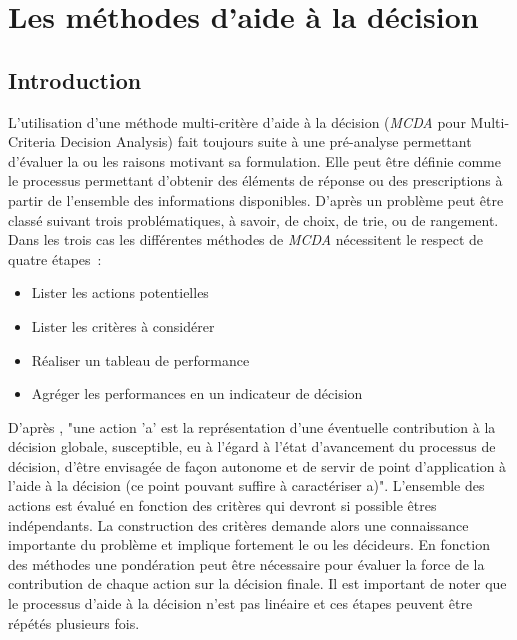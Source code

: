 
\section{Les méthodes d’aide à la décision} %
\label{sec:les_methodes_d_aide_à_la_decision}
\subsection{Introduction} %
\label{sub:introduction}
L’utilisation d’une méthode multi-critère d’aide à la décision (\textit{MCDA} pour Multi-Criteria
Decision Analysis) fait toujours suite à une pré-analyse permettant d’évaluer la ou les
raisons motivant sa formulation. Elle peut être définie comme le processus permettant
d’obtenir des éléments de réponse ou des prescriptions à partir de l’ensemble des
informations disponibles. D’après  un problème peut être
classé suivant trois problématiques, à savoir, de choix, de trie, ou de rangement. Dans les
trois cas les différentes méthodes de \textit{MCDA} nécessitent le respect de quatre étapes~:
\begin{itemize}
  \item Lister les actions potentielles
  \item Lister les critères à considérer
  \item Réaliser un tableau de performance
  \item Agréger les performances en un indicateur de décision
\end{itemize}
D’après , "une action 'a' est la représentation d’une
éventuelle contribution à la décision globale, susceptible, eu à l’égard à l’état
d’avancement du processus de décision, d’être envisagée de façon autonome et de servir de
point d’application à l’aide à la décision (ce point pouvant suffire à caractériser a)".
L’ensemble des actions est évalué en fonction des critères qui devront si possible êtres
indépendants. La construction des critères demande alors une connaissance importante du
problème et implique fortement le ou les décideurs. En fonction des méthodes une
pondération peut être nécessaire pour évaluer la force de la contribution de chaque action
sur la décision finale. Il est important de noter que le processus d’aide à la décision
n’est pas linéaire et ces étapes peuvent être répétés plusieurs fois.

